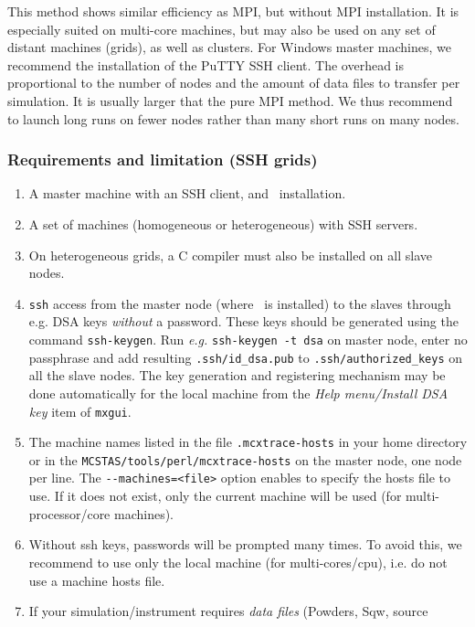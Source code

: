   This method shows similar efficiency as MPI, but without MPI installation. It is 
  especially suited on multi-core machines, but may also be used on any set of distant 
  machines (grids), as well as clusters. For Windows master machines,
  we recommend the installation of the PuTTY SSH client. The overhead is proportional to
  the number of nodes and the amount of data files to transfer per simulation. It is 
  usually larger that the pure MPI method. We thus recommend to launch long runs on fewer nodes
  rather than many short runs on many nodes.
  
\subsubsection{Requirements and limitation (SSH grids)}

  \begin{enumerate}
  \item{A master machine with an SSH client, and \MCX\ installation.}
  \item{A set of machines (homogeneous or heterogeneous) with SSH servers.}
  \item{On heterogeneous grids, a C compiler must also be installed on all slave nodes.}
  \item{\texttt{ssh} access from the master node (where \MCX\ is
      installed) to the slaves through e.g. DSA keys \emph{without} a
      password. These keys should be generated using the command
      \texttt{ssh-keygen}. Run \emph{e.g.} \texttt{ssh-keygen -t dsa} on
      master node, enter no passphrase and add resulting
      \texttt{.ssh/id\_dsa.pub} to \texttt{.ssh/authorized\_keys}
      on all the slave nodes. The key generation and registering mechanism 
      may be done automatically for the local machine from the 
      \emph{Help menu/Install DSA key} item of \verb+mxgui+.}
  \item{The machine names listed in the file \texttt{.mcxtrace-hosts} in
      your home directory or in the \texttt{MCSTAS/tools/perl/mcxtrace-hosts} on
      the master node, one node per line. The \verb'--machines=<file>' option
      enables to specify the hosts file to use. If it does not exist, only 
      the current machine will be used (for multi-processor/core machines).}
  \item{Without ssh keys, passwords will be prompted many times. To avoid this, 
      we recommend to use only the local machine (for multi-cores/cpu), i.e. do
      not use a machine hosts file.}
  \item{If your simulation/instrument requires \emph{data files} (Powders, Sqw, source 
}
\end{enumerate}
